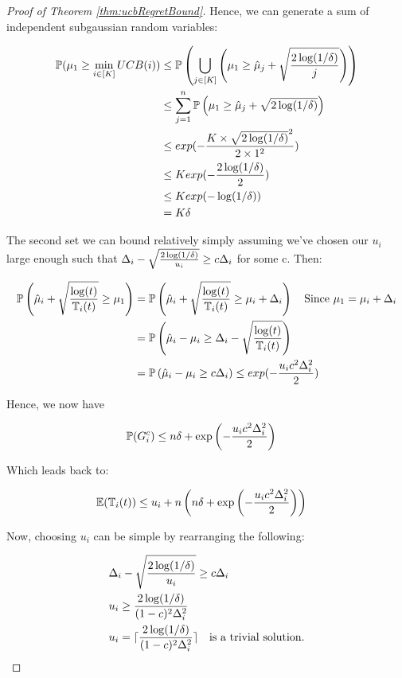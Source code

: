 \begin{proof}[Proof of Theorem \ref{thm:ucbRegretBound}]
Hence, we can generate a sum of independent subgaussian random variables:

\begin{align*}
\mathbb{P}(\mu_1 \geq \min_{i \in [K]} UCB(i))
&\leq \mathbb{P} \left(\bigcup_{j \in [K]} \left( \mu_1 \geq \hat{\mu}_j + \sqrt{\frac{2\log(1/\delta)}{j}} \right) \right) \\
&\leq \sum_{j=1}^{n} \mathbb{P} \left( \mu_1 \geq \hat{\mu}_j + \sqrt{2\log(1/\delta)} \right) \\
&\leq exp(-\frac{K \times \sqrt{2\log(1/\delta)}^2}{2 \times 1^2}) \\
&\leq K exp(-\frac{2\log(1/\delta)}{2}) \\
&\leq K exp(-\log(1/\delta)) \\
&= K \delta
\end{align*}

The second set we can bound relatively simply assuming we've chosen our $u_i$ large enough such that $\Delta_{i} - \sqrt{\frac{2\log(1/\delta)}{u_i}} \geq c \Delta_{i}$ for some c. Then:

\begin{align*}
\mathbb{P}\left( \hat{\mu}_i + \sqrt{\frac{\log(t)}{\mathbb{T}_{i}(t)}} \geq \mu_1 \right)
&= \mathbb{P}\left( \hat{\mu}_i + \sqrt{\frac{\log(t)}{\mathbb{T}_{i}(t)}} \geq \mu_{i} + \Delta_{i} \right) \quad \text{Since $\mu_1 = \mu_{i} + \Delta_{i}$} \\
&= \mathbb{P}\left( \hat{\mu}_i - \mu_{i} \geq \Delta_{i} - \sqrt{\frac{\log(t)}{\mathbb{T}_{i}(t)}} \right) \\
&= \mathbb{P}\left( \hat{\mu}_i - \mu_{i} \geq c \Delta_{i} \right)
\leq exp(-\frac{u_i c^2 \Delta_{i}^2}{2})
\end{align*}

Hence, we now have

\begin{align*}
\mathbb{P}(G_i^c) &\leq n \delta + \exp\left(-\frac{u_i c^2 \Delta_{i}^2}{2}\right)
\end{align*}

Which leads back to:

\begin{align*}
\mathbb{E}(\mathbb{T}_{i}(t)) &\leq u_i + n \left(n \delta + \exp\left(-\frac{u_i c^2 \Delta_{i}^2}{2}\right)\right)
\end{align*}

Now, choosing $u_i$ can be simple by rearranging the following:

\begin{align*}
& \Delta_{i} - \sqrt{\frac{2\log(1/\delta)}{u_i}} \geq c \Delta_{i} \\
& u_i \geq \frac{2\log(1/\delta)}{(1-c)^2\Delta_{i}^2} \\
& u_i = \lceil \frac{2\log(1/\delta)}{(1-c)^2\Delta_{i}^2} \rceil \quad \text{is a trivial solution.}
\end{align*}


\end{proof}
